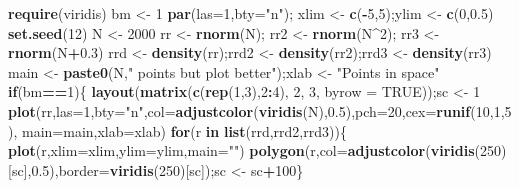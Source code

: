 \documentclass[10,portrait]{article}
\newenvironment{Shaded}{\begin{snugshade}}{\end{snugshade}}
\newcommand{\KeywordTok}[1]{\textcolor[rgb]{0.13,0.29,0.53}{\textbf{#1}}}
\newcommand{\DataTypeTok}[1]{\textcolor[rgb]{0.13,0.29,0.53}{#1}}
\newcommand{\DecValTok}[1]{\textcolor[rgb]{0.00,0.00,0.81}{#1}}
\newcommand{\FloatTok}[1]{\textcolor[rgb]{0.00,0.00,0.81}{#1}}
\newcommand{\StringTok}[1]{\textcolor[rgb]{0.31,0.60,0.02}{#1}}
\newcommand{\OtherTok}[1]{\textcolor[rgb]{0.56,0.35,0.01}{#1}}
\newcommand{\ControlFlowTok}[1]{\textcolor[rgb]{0.13,0.29,0.53}{\textbf{#1}}}
\newcommand{\OperatorTok}[1]{\textcolor[rgb]{0.81,0.36,0.00}{\textbf{#1}}}
\newcommand{\NormalTok}[1]{#1}
\begin{document}
\begin{Shaded}
\begin{Highlighting}[]
\KeywordTok{require}\NormalTok{(viridis)}
\NormalTok{bm <-}\StringTok{ }\DecValTok{1}
\KeywordTok{par}\NormalTok{(}\DataTypeTok{las=}\DecValTok{1}\NormalTok{,}\DataTypeTok{bty=}\StringTok{"n"}\NormalTok{); xlim <-}\StringTok{ }\KeywordTok{c}\NormalTok{(}\OperatorTok{-}\DecValTok{5}\NormalTok{,}\DecValTok{5}\NormalTok{);ylim <-}\StringTok{ }\KeywordTok{c}\NormalTok{(}\DecValTok{0}\NormalTok{,}\FloatTok{0.5}\NormalTok{)}
\KeywordTok{set.seed}\NormalTok{(}\DecValTok{12}\NormalTok{)}
\NormalTok{N <-}\StringTok{ }\DecValTok{2000}
\NormalTok{rr <-}\StringTok{ }\KeywordTok{rnorm}\NormalTok{(N); rr2 <-}\StringTok{ }\KeywordTok{rnorm}\NormalTok{(N}\OperatorTok{^}\DecValTok{2}\NormalTok{); rr3 <-}\StringTok{ }\KeywordTok{rnorm}\NormalTok{(N}\OperatorTok{+}\FloatTok{0.3}\NormalTok{)}
\NormalTok{rrd <-}\StringTok{ }\KeywordTok{density}\NormalTok{(rr);rrd2 <-}\StringTok{ }\KeywordTok{density}\NormalTok{(rr2);rrd3 <-}\StringTok{ }\KeywordTok{density}\NormalTok{(rr3)}
\NormalTok{main <-}\StringTok{ }\KeywordTok{paste0}\NormalTok{(N,}\StringTok{" points but plot better"}\NormalTok{);xlab <-}\StringTok{ "Points in space"}
\ControlFlowTok{if}\NormalTok{(bm}\OperatorTok{==}\DecValTok{1}\NormalTok{)\{}
  \KeywordTok{layout}\NormalTok{(}\KeywordTok{matrix}\NormalTok{(}\KeywordTok{c}\NormalTok{(}\KeywordTok{rep}\NormalTok{(}\DecValTok{1}\NormalTok{,}\DecValTok{3}\NormalTok{),}\DecValTok{2}\OperatorTok{:}\DecValTok{4}\NormalTok{), }\DecValTok{2}\NormalTok{, }\DecValTok{3}\NormalTok{, }\DataTypeTok{byrow =} \OtherTok{TRUE}\NormalTok{));sc <-}\StringTok{ }\DecValTok{1}
  \KeywordTok{plot}\NormalTok{(rr,}\DataTypeTok{las=}\DecValTok{1}\NormalTok{,}\DataTypeTok{bty=}\StringTok{"n"}\NormalTok{,}\DataTypeTok{col=}\KeywordTok{adjustcolor}\NormalTok{(}\KeywordTok{viridis}\NormalTok{(N),}\FloatTok{0.5}\NormalTok{),}\DataTypeTok{pch=}\DecValTok{20}\NormalTok{,}\DataTypeTok{cex=}\KeywordTok{runif}\NormalTok{(}\DecValTok{10}\NormalTok{,}\DecValTok{1}\NormalTok{,}\DecValTok{5}\NormalTok{),}
       \DataTypeTok{main=}\NormalTok{main,}\DataTypeTok{xlab=}\NormalTok{xlab)}
\ControlFlowTok{for}\NormalTok{(r }\ControlFlowTok{in} \KeywordTok{list}\NormalTok{(rrd,rrd2,rrd3))\{}
  \KeywordTok{plot}\NormalTok{(r,}\DataTypeTok{xlim=}\NormalTok{xlim,}\DataTypeTok{ylim=}\NormalTok{ylim,}\DataTypeTok{main=}\StringTok{""}\NormalTok{)}
  \KeywordTok{polygon}\NormalTok{(r,}\DataTypeTok{col=}\KeywordTok{adjustcolor}\NormalTok{(}\KeywordTok{viridis}\NormalTok{(}\DecValTok{250}\NormalTok{)[sc],}\FloatTok{0.5}\NormalTok{),}\DataTypeTok{border=}\KeywordTok{viridis}\NormalTok{(}\DecValTok{250}\NormalTok{)[sc]);sc <-}\StringTok{ }\NormalTok{sc}\OperatorTok{+}\DecValTok{100}\NormalTok{\}}

\end{Highlighting}
\end{Shaded}
\end{document}
